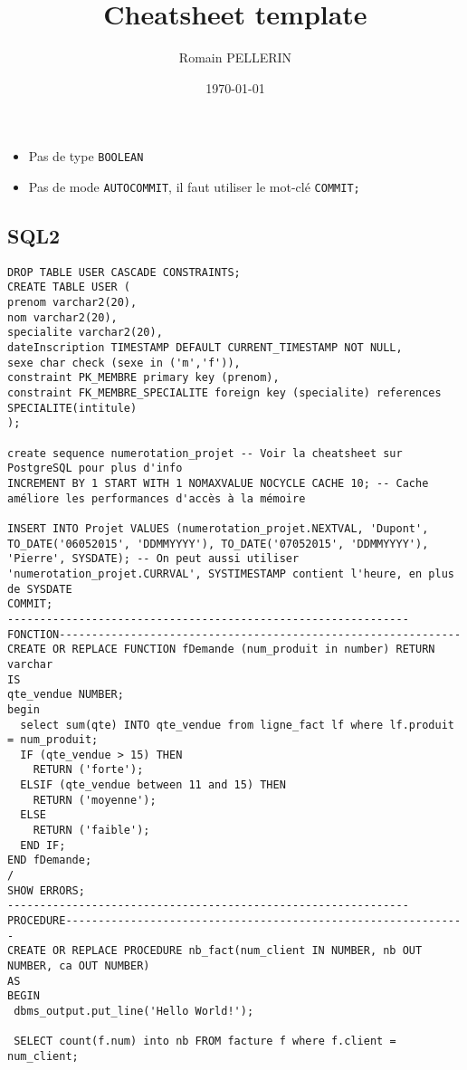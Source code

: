 \documentclass[11pt,a4paper,oneside,french,svgnames]{report}
\title{Cheatsheet template}
\author{Romain PELLERIN}
\date\today
\newcommand{\code}[2]{\lstset{
  language=#2,
  title={{\setlength{\fboxsep}{1pt}\fcolorbox{orange}{yellow!20}{\sffamily\scriptsize
              \textcolor{gray!10}{\_}{#1}\textcolor{gray!10}{\_}}}}
  }
}
\begin{document}
\scriptsize

\begin{itemize}
  \item Pas de type \lstinline{BOOLEAN}
  \item Pas de mode \lstinline{AUTOCOMMIT}, il faut utiliser le mot-clé \lstinline{COMMIT;}
\end{itemize}

\subsection*{SQL2}
\code{PL/SQL}{SQL}
\begin{lstlisting}
DROP TABLE USER CASCADE CONSTRAINTS;
CREATE TABLE USER ( 
prenom varchar2(20), 
nom varchar2(20), 
specialite varchar2(20), 
dateInscription TIMESTAMP DEFAULT CURRENT_TIMESTAMP NOT NULL,
sexe char check (sexe in ('m','f')),
constraint PK_MEMBRE primary key (prenom),
constraint FK_MEMBRE_SPECIALITE foreign key (specialite) references SPECIALITE(intitule)
);

create sequence numerotation_projet -- Voir la cheatsheet sur PostgreSQL pour plus d'info
INCREMENT BY 1 START WITH 1 NOMAXVALUE NOCYCLE CACHE 10; -- Cache améliore les performances d'accès à la mémoire

INSERT INTO Projet VALUES (numerotation_projet.NEXTVAL, 'Dupont', TO_DATE('06052015', 'DDMMYYYY'), TO_DATE('07052015', 'DDMMYYYY'), 'Pierre', SYSDATE); -- On peut aussi utiliser 'numerotation_projet.CURRVAL', SYSTIMESTAMP contient l'heure, en plus de SYSDATE
COMMIT;
--------------------------------------------------------------FONCTION--------------------------------------------------------------
CREATE OR REPLACE FUNCTION fDemande (num_produit in number) RETURN varchar
IS
qte_vendue NUMBER;
begin
  select sum(qte) INTO qte_vendue from ligne_fact lf where lf.produit = num_produit;
  IF (qte_vendue > 15) THEN
    RETURN ('forte');
  ELSIF (qte_vendue between 11 and 15) THEN
    RETURN ('moyenne');
  ELSE
    RETURN ('faible');
  END IF;
END fDemande;
/
SHOW ERRORS;
--------------------------------------------------------------PROCEDURE--------------------------------------------------------------
CREATE OR REPLACE PROCEDURE nb_fact(num_client IN NUMBER, nb OUT NUMBER, ca OUT NUMBER)
AS
BEGIN
 dbms_output.put_line('Hello World!');
 
 SELECT count(f.num) into nb FROM facture f where f.client = num_client;
 

\end{lstlisting}
\end{document}
